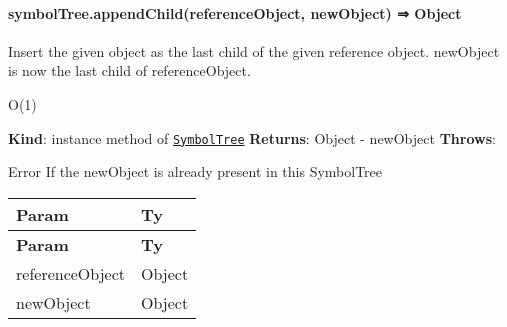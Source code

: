 \label{_module_symbol-tree--SymbolTree+appendChild}%


\paragraph*{symbol\+Tree.\+append\+Child(reference\+Object, new\+Object) ⇒ {\ttfamily Object}}

Insert the given object as the last child of the given reference object. {\ttfamily new\+Object} is now the last child of {\ttfamily reference\+Object}.


\begin{DoxyItemize}
\item {\ttfamily O(1)}
\end{DoxyItemize}

{\bfseries Kind}\+: instance method of {\ttfamily \href{#exp_module_symbol-tree--SymbolTree}{\tt Symbol\+Tree}} {\bfseries Returns}\+: {\ttfamily Object} -\/ new\+Object {\bfseries Throws}\+:


\begin{DoxyItemize}
\item {\ttfamily Error} If the new\+Object is already present in this Symbol\+Tree
\end{DoxyItemize}

\tabulinesep=1mm
\begin{longtabu} spread 0pt [c]{*{2}{|X[-1]}|}
\hline
\rowcolor{\tableheadbgcolor}\textbf{ Param  }&\textbf{ Ty   }\\
\endfirsthead
\hline
\endfoot
\hline
\rowcolor{\tableheadbgcolor}\textbf{ Param  }&\textbf{ Ty   }\\
\endhead
reference\+Object  &{\ttfamily Object}   \\
new\+Object  &{\ttfamily Object}   \\
\end{longtabu}
